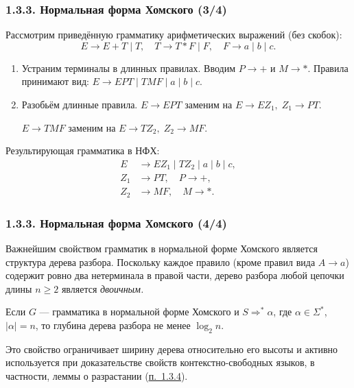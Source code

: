 \documentclass[mathserif,12pt,aspectratio=169]{beamer}
\def\emразделенной{\em разделенной}
\def\em#1{\it\color{blue}#1}
\let\ge\geqslant
\def\DMref#1#2{{\color{blue}\underline{\hyperlink{#2}{#1}}}}
\begin{document}
\begin{frame}
\frametitle{1.3.3. Нормальная форма Хомского (3/4)}

\begin{example}
Рассмотрим приведённую грамматику арифметических выражений (без скобок):
\[
E \to E+T \mid T, \quad T \to T*F \mid F, \quad F \to a \mid b \mid c.
\]

\begin{enumerate}
    \item Устраним терминалы в длинных правилах. Вводим $P \to +$ и $M \to *$.
    Правила принимают вид:
    $E \to EPT \mid TMF \mid a \mid b \mid c$.
    \item Разобьём длинные правила.
    $E \to EPT$ заменим на $E \to E Z_1,\; Z_1 \to PT$.
    
    $E \to TMF$ заменим на $E \to T Z_2,\; Z_2 \to MF$.
\end{enumerate}
Результирующая грамматика в НФХ:
\[
\begin{aligned}
E &\to E Z_1 \mid T Z_2 \mid a \mid b \mid c, \\
Z_1 &\to P T, \quad P \to +, \\
Z_2 &\to M F, \quad M \to *.
\end{aligned}
\]
\end{example}
\end{frame}

\begin{frame}
  \frametitle{1.3.3. Нормальная форма Хомского (4/4)}

  \begin{remark}
    Важнейшим свойством грамматик в нормальной форме Хомского является
    структура дерева разбора. Поскольку каждое правило (кроме правил вида $A\to a$) содержит
    ровно два нетерминала в правой части, дерево разбора любой цепочки
    длины $n\ge 2$ является \em{двоичным}.
  \end{remark}

  \begin{corollary}
    Если $G$ — грамматика в нормальной форме Хомского и $S\Rightarrow^*\alpha$,
    где $\alpha\in\Sigma^*$, $|\alpha|=n$, то глубина дерева разбора не менее
    $\log_2 n$.
  \end{corollary}

  \medskip
  Это свойство ограничивает ширину дерева относительно его высоты и
  активно используется при доказательстве свойств контекстно-свободных языков,
  в частности, леммы о разрастании (\DMref{п.~1.3.4}{1.3.4.}).

\end{frame}
\end{document}
